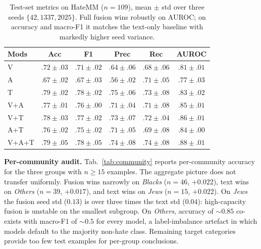 \documentclass{article}
\begin{document}
\begin{table}[t]
\vskip 0.08in
\begin{center}
\begin{small}
\begin{sc}
\setlength{\tabcolsep}{3pt}
\begin{tabular}{lccccc}
\toprule
Mods & Acc & F1 & Prec & Rec & AUROC \\
\midrule
V & $.72{\pm}.03$ & $.71{\pm}.02$ & $.64{\pm}.06$ & $.68{\pm}.06$ & $.81{\pm}.01$ \\
A & $.67{\pm}.02$ & $.67{\pm}.03$ & $.56{\pm}.02$ & $.71{\pm}.05$ & $.77{\pm}.03$ \\
T & $.79{\pm}.02$ & $.78{\pm}.02$ & $.75{\pm}.06$ & $.73{\pm}.08$ & $.83{\pm}.02$ \\
\midrule
V+A & $.77{\pm}.01$ & $.76{\pm}.00$ & $.71{\pm}.04$ & $.71{\pm}.08$ & $.85{\pm}.01$ \\
V+T & $.78{\pm}.03$ & $.77{\pm}.02$ & $.73{\pm}.07$ & $.72{\pm}.04$ & $.86{\pm}.01$ \\
A+T & $.76{\pm}.02$ & $.75{\pm}.02$ & $.71{\pm}.05$ & $.69{\pm}.08$ & $.84{\pm}.00$ \\
\midrule
V+A+T & $.79{\pm}.05$ & $.78{\pm}.05$ & $.74{\pm}.08$ & $.74{\pm}.08$ & $\mathbf{.88{\pm}.01}$ \\
\bottomrule
\end{tabular}
\caption{Test-set metrics on HateMM ($n=109$), mean $\pm$ std over three seeds $\{42, 1337, 2025\}$. Full fusion wins robustly on AUROC; on accuracy and macro-F1 it matches the text-only baseline with markedly higher seed variance.}
\label{tab:ablation}
\end{sc}
\end{small}
\end{center}
\vskip -0.10in
\end{table}

\textbf{Per-community audit.} Tab.~\ref{tab:community} reports per-community accuracy for the three groups with $n \geq 15$ examples. The aggregate picture does not transfer uniformly. Fusion wins narrowly on \emph{Blacks} ($n{=}46$, $+0.022$), text wins on \emph{Others} ($n{=}39$, $+0.017$), and text wins on \emph{Jews} ($n{=}15$, $+0.022$). On \emph{Jews} the fusion seed std ($0.13$) is over three times the text std ($0.04$): high-capacity fusion is unstable on the smallest subgroup. On \emph{Others}, accuracy of ${\sim}0.85$ co-exists with macro-F1 of ${\sim}0.5$ for every model, a label-imbalance artefact in which models default to the majority non-hate class. Remaining target categories provide too few test examples for per-group conclusions.
\end{document}
